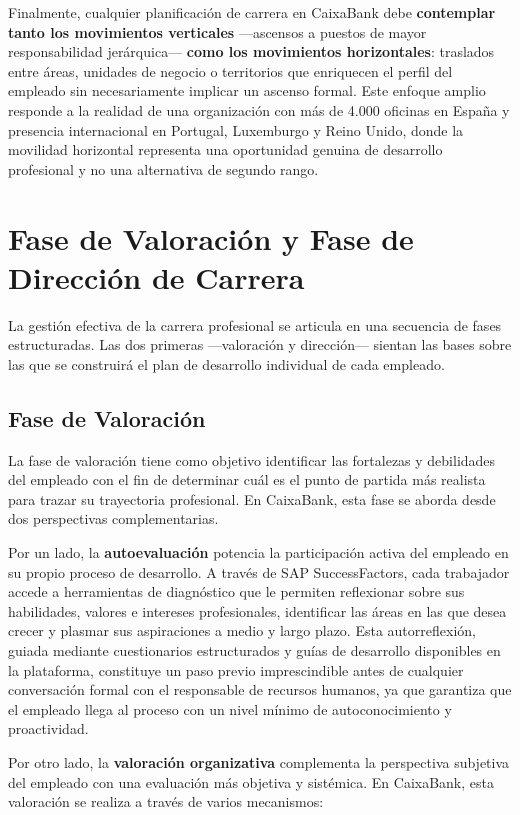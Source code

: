 Finalmente, cualquier planificación de carrera en CaixaBank debe \textbf{contemplar tanto los
movimientos verticales} —ascensos a puestos de mayor responsabilidad jerárquica— \textbf{como los
movimientos horizontales}: traslados entre áreas, unidades de negocio o territorios que enriquecen
el perfil del empleado sin necesariamente implicar un ascenso formal. Este enfoque amplio responde
a la realidad de una organización con más de 4.000 oficinas en España y presencia internacional
en Portugal, Luxemburgo y Reino Unido, donde la movilidad horizontal representa una oportunidad
genuina de desarrollo profesional y no una alternativa de segundo rango.

\section{Fase de Valoración y Fase de Dirección de Carrera}

La gestión efectiva de la carrera profesional se articula en una secuencia de fases estructuradas.
Las dos primeras —valoración y dirección— sientan las bases sobre las que se construirá el plan
de desarrollo individual de cada empleado.

\subsection{Fase de Valoración}

La fase de valoración tiene como objetivo identificar las fortalezas y debilidades del empleado
con el fin de determinar cuál es el punto de partida más realista para trazar su trayectoria
profesional. En CaixaBank, esta fase se aborda desde dos perspectivas complementarias.

Por un lado, la \textbf{autoevaluación} potencia la participación activa del empleado en su
propio proceso de desarrollo. A través de SAP SuccessFactors, cada trabajador accede a
herramientas de diagnóstico que le permiten reflexionar sobre sus habilidades, valores e
intereses profesionales, identificar las áreas en las que desea crecer y plasmar sus aspiraciones
a medio y largo plazo. Esta autorreflexión, guiada mediante cuestionarios estructurados y guías
de desarrollo disponibles en la plataforma, constituye un paso previo imprescindible antes
de cualquier conversación formal con el responsable de recursos humanos, ya que garantiza que
el empleado llega al proceso con un nivel mínimo de autoconocimiento y proactividad.

Por otro lado, la \textbf{valoración organizativa} complementa la perspectiva subjetiva del
empleado con una evaluación más objetiva y sistémica. En CaixaBank, esta valoración se realiza
a través de varios mecanismos:

